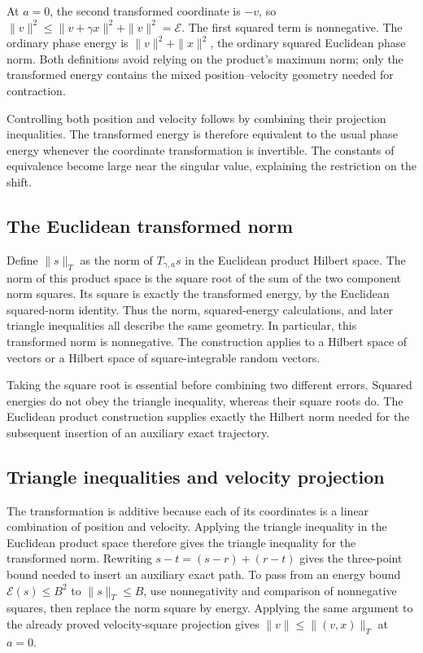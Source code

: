 \documentclass[11pt,a4paper]{report}
\begin{document}
At \(a=0\), the second transformed coordinate is \(-v\), so \(\|v\|^2\le\|v+\gamma x\|^2+\|v\|^2=\mathcal E\). The first squared term is nonnegative. The ordinary phase energy is \(\|v\|^2+\|x\|^2\), the ordinary squared Euclidean phase norm. Both definitions avoid relying on the product's maximum norm; only the transformed energy contains the mixed position–velocity geometry needed for contraction.



Controlling both position and velocity follows by combining their projection inequalities. The transformed energy is therefore equivalent to the usual phase energy whenever the coordinate transformation is invertible. The constants of equivalence become large near the singular value, explaining the restriction on the shift.

\subsection{\texorpdfstring{The Euclidean transformed norm}{The Euclidean transformed norm}}
\label{report-step-KineticLangevin-Geometry-lean-6}


Define \(\|s\|_T\) as the norm of \(T_{\gamma,a}s\) in the Euclidean product Hilbert space. The norm of this product space is the square root of the sum of the two component norm squares. Its square is exactly the transformed energy, by the Euclidean squared-norm identity. Thus the norm, squared-energy calculations, and later triangle inequalities all describe the same geometry. In particular, this transformed norm is nonnegative. The construction applies to a Hilbert space of vectors or a Hilbert space of square-integrable random vectors.



Taking the square root is essential before combining two different errors. Squared energies do not obey the triangle inequality, whereas their square roots do. The Euclidean product construction supplies exactly the Hilbert norm needed for the subsequent insertion of an auxiliary exact trajectory.

\subsection{\texorpdfstring{Triangle inequalities and velocity projection}{Triangle inequalities and velocity projection}}
\label{report-step-KineticLangevin-Geometry-lean-7}


The transformation is additive because each of its coordinates is a linear combination of position and velocity. Applying the triangle inequality in the Euclidean product space therefore gives the triangle inequality for the transformed norm. Rewriting \(s-t=(s-r)+(r-t)\) gives the three-point bound needed to insert an auxiliary exact path. To pass from an energy bound \(\mathcal E(s)\le B^2\) to \(\|s\|_T\le B\), use nonnegativity and comparison of nonnegative squares, then replace the norm square by energy. Applying the same argument to the already proved velocity-square projection gives \(\|v\|\le\|(v,x)\|_T\) at \(a=0\).
\end{document}

